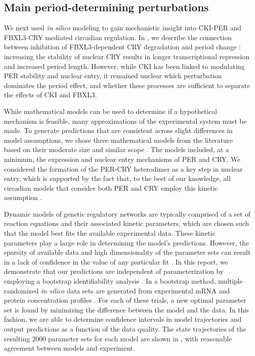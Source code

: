 \subsection{Main period-determining perturbations}

We next used {\it in silico} modeling to gain mechanistic insight into CKI-PER and FBXL3-CRY mediated circadian regulation. 
In , we describe the connection between inhibition of FBXL3-dependent CRY degradation and period change \cite{Hirota2012}: increasing the stability of nuclear CRY results in longer transcriptional repression and increased period length. 
However, while CKI has been linked to modulating PER stability and nuclear entry, it remained unclear which perturbation dominates the period effect, and whether these processes are sufficient to separate the effects of CKI and FBXL3.

While mathematical models can be used to determine if a hypothetical mechanism is feasible, many approximations of the experimental system must be made. 
To generate predictions that are consistent across slight differences in model assumptions, we chose three mathematical models from the literature based on their moderate size and similar scope \cite{Hirota2012, Leloup2003, Relogio2011}. 
The models included, at a minimum, the expression and nuclear entry mechanisms of PER and CRY. 
We considered the formation of the PER-CRY heterodimer as a key step in nuclear entry, which is supported by the fact that, to the best of our knowledge, all circadian models that consider both PER and CRY employ this kinetic assumption \cite{Hirota2012, Relogio2011, Leloup2003, Forger2003, Mirsky2009}.

Dynamic models of genetic regulatory networks are typically comprised of a set of reaction equations and their associated kinetic parameters, which are chosen such that the model best fits the available experimental data. 
These kinetic parameters play a large role in determining the model's predictions. 
However, the sparsity of available data and high dimensionality of the parameter sets can result in a lack of confidence in the value of any particular fit \cite{Gunawan2006}. 
In this report, we demonstrate that our predictions are independent of parameterization by employing a bootstrap identifiability analysis \cite{St.John2013}. 
In a bootstrap method, multiple randomized {\itshape in silico} data sets are generated from experimental mRNA and protein concentration profiles \cite{Lee2001}. 
For each of these trials, a new optimal parameter set is found by minimizing the difference between the model and the data. 
In this fashion, we are able to determine confidence intervals in model trajectories and output predictions as a function of the data quality. 
The state trajectories of the resulting 2000 parameter sets for each model are shown in , with reasonable agreement between models and experiment.

